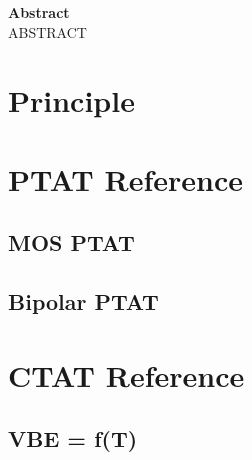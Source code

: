 \documentclass[11pt,a4paper]{report}
\begin{document}

{}
\renewcommand{\contentsname}{Sommaire}
\tableofcontents


% 
% 
% 
% 
% 

\newpage
% 
\vspace{3cm}
\textbf{Abstract} \\
\newline
\hspace*{17pt} ABSTRACT

\listoffigures

\listoftables


\newpage


\chapter{Principle}
\chapter{PTAT Reference}
\section{MOS PTAT}
\section{Bipolar PTAT}
\chapter{CTAT Reference}
\section{VBE = f(T) }
\end{document}
